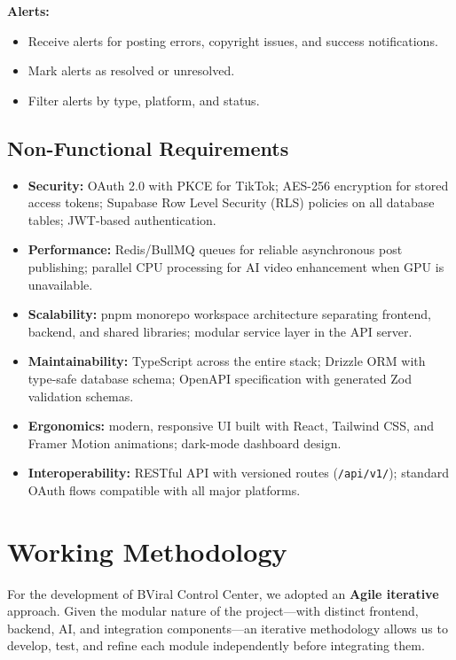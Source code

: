 \textbf{Alerts:}
\begin{itemize}
    \item Receive alerts for posting errors, copyright issues, and success notifications.
    \item Mark alerts as resolved or unresolved.
    \item Filter alerts by type, platform, and status.
\end{itemize}

\subsection{Non-Functional Requirements}

\begin{itemize}
    \item \textbf{Security:} OAuth 2.0 with PKCE for TikTok; AES-256 encryption for stored access tokens; Supabase Row Level Security (RLS) policies on all database tables; JWT-based authentication.
    \item \textbf{Performance:} Redis/BullMQ queues for reliable asynchronous post publishing; parallel CPU processing for AI video enhancement when GPU is unavailable.
    \item \textbf{Scalability:} pnpm monorepo workspace architecture separating frontend, backend, and shared libraries; modular service layer in the API server.
    \item \textbf{Maintainability:} TypeScript across the entire stack; Drizzle ORM with type-safe database schema; OpenAPI specification with generated Zod validation schemas.
    \item \textbf{Ergonomics:} modern, responsive UI built with React, Tailwind CSS, and Framer Motion animations; dark-mode dashboard design.
    \item \textbf{Interoperability:} RESTful API with versioned routes (\texttt{/api/v1/}); standard OAuth flows compatible with all major platforms.
\end{itemize}

\section{Working Methodology}

For the development of BViral Control Center, we adopted an \textbf{Agile iterative} approach. Given the modular nature of the project---with distinct frontend, backend, AI, and integration components---an iterative methodology allows us to develop, test, and refine each module independently before integrating them.

